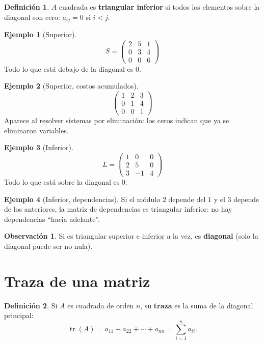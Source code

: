 \documentclass[a4paper,12pt]{article}
\theoremstyle{definition}
\newtheorem{definicion}{Definición}[section]
\newtheorem{ejemplo}{Ejemplo}[section]
\newtheorem{observacion}{Observación}[section]
\begin{document}
\begin{definicion}
$A$ cuadrada es \textbf{triangular inferior} si todos los elementos sobre la diagonal son cero: $a_{ij}=0$ si $i<j$.
\end{definicion}

\begin{ejemplo}[Superior]
\[
S = \begin{pmatrix}
2 & 5 & 1 \\
0 & 3 & 4 \\
0 & 0 & 6
\end{pmatrix}
\]
Todo lo que está debajo de la diagonal es $0$.
\end{ejemplo}

\begin{ejemplo}[Superior, costos acumulados]
\[
\begin{pmatrix}
1 & 2 & 3 \\
0 & 1 & 4 \\
0 & 0 & 1
\end{pmatrix}
\]
Aparece al resolver sistemas por eliminación: los ceros indican que ya se eliminaron variables.
\end{ejemplo}

\begin{ejemplo}[Inferior]
\[
L = \begin{pmatrix}
1 & 0 & 0 \\
2 & 5 & 0 \\
3 & -1 & 4
\end{pmatrix}
\]
Todo lo que está sobre la diagonal es $0$.
\end{ejemplo}

\begin{ejemplo}[Inferior, dependencias]
Si el módulo $2$ depende del $1$ y el $3$ depende de los anteriores, la matriz de dependencias es triangular inferior: no hay dependencias ``hacia adelante''.
\end{ejemplo}

\begin{observacion}
Si es triangular superior e inferior a la vez, es \textbf{diagonal} (solo la diagonal puede ser no nula).
\end{observacion}

\newpage

\section{Traza de una matriz}
\begin{definicion}
Si $A$ es cuadrada de orden $n$, su \textbf{traza} es la suma de la diagonal principal:
\[
\operatorname{tr}(A) = a_{11}+a_{22}+\cdots+a_{nn} = \sum_{i=1}^{n} a_{ii}.
\]
\end{definicion}
\end{document}
